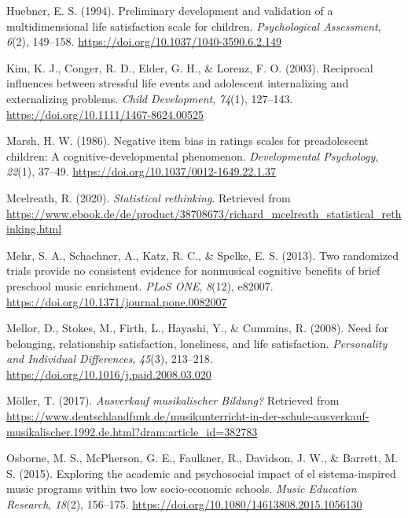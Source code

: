 \documentclass[a4, 12pt]{article}
\begin{document}
\leavevmode\hypertarget{ref-Huebner1994}{}%
Huebner, E. S. (1994). Preliminary development and validation of a multidimensional life satisfaction scale for children. \emph{Psychological Assessment}, \emph{6}(2), 149--158. \url{https://doi.org/10.1037/1040-3590.6.2.149}

\leavevmode\hypertarget{ref-Kim2003}{}%
Kim, K. J., Conger, R. D., Elder, G. H., \& Lorenz, F. O. (2003). Reciprocal influences between stressful life events and adolescent internalizing and externalizing problems. \emph{Child Development}, \emph{74}(1), 127--143. \url{https://doi.org/10.1111/1467-8624.00525}

\leavevmode\hypertarget{ref-Marsh1986}{}%
Marsh, H. W. (1986). Negative item bias in ratings scales for preadolescent children: A cognitive-developmental phenomenon. \emph{Developmental Psychology}, \emph{22}(1), 37--49. \url{https://doi.org/10.1037/0012-1649.22.1.37}

\leavevmode\hypertarget{ref-Mcelreath2020}{}%
Mcelreath, R. (2020). \emph{Statistical rethinking}. Retrieved from \url{https://www.ebook.de/de/product/38708673/richard_mcelreath_statistical_rethinking.html}

\leavevmode\hypertarget{ref-Mehr2013}{}%
Mehr, S. A., Schachner, A., Katz, R. C., \& Spelke, E. S. (2013). Two randomized trials provide no consistent evidence for nonmusical cognitive benefits of brief preschool music enrichment. \emph{PLoS ONE}, \emph{8}(12), e82007. \url{https://doi.org/10.1371/journal.pone.0082007}

\leavevmode\hypertarget{ref-Mellor2008}{}%
Mellor, D., Stokes, M., Firth, L., Hayashi, Y., \& Cummins, R. (2008). Need for belonging, relationship satisfaction, loneliness, and life satisfaction. \emph{Personality and Individual Differences}, \emph{45}(3), 213--218. \url{https://doi.org/10.1016/j.paid.2008.03.020}

\leavevmode\hypertarget{ref-Moeller2017}{}%
Möller, T. (2017). \emph{Ausverkauf musikalischer Bildung?} Retrieved from \url{https://www.deutschlandfunk.de/musikunterricht-in-der-schule-ausverkauf-musikalischer.1992.de.html?dram:article_id=382783}

\leavevmode\hypertarget{ref-Osborne2015}{}%
Osborne, M. S., McPherson, G. E., Faulkner, R., Davidson, J. W., \& Barrett, M. S. (2015). Exploring the academic and psychosocial impact of el sistema-inspired music programs within two low socio-economic schools. \emph{Music Education Research}, \emph{18}(2), 156--175. \url{https://doi.org/10.1080/14613808.2015.1056130}
\end{document}
